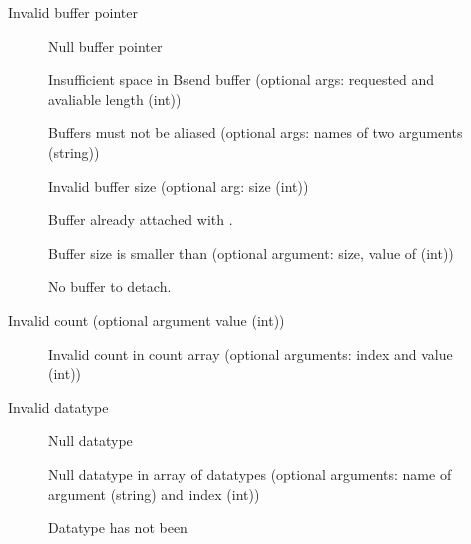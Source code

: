 \begin{description}
\item[ ]Invalid buffer pointer
    \begin{description}
    \item[ ]Null buffer pointer
    \item[
    ]Insufficient space in Bsend 
      buffer (optional args: requested and avaliable length (int))
    \item[ ]Buffers
    must not be aliased 
      (optional args: names of two arguments (string))
    \item[ ]Invalid
    buffer size (optional arg: 
      size (int))
    \item[
    ]Buffer already attached with 
      . 
    \item[
    ]Buffer size is smaller than 
       (optional argument: size, value of
       (int)) 
    \item[ ]No
    buffer to detach. 
    \end{description}
\item[ ]Invalid count (optional
    argument value (int)) 
    \begin{description}
    \item[ ]Invalid
    count in count array 
      (optional arguments: index and value (int))
    \end{description}
\item[ ]Invalid datatype
    \begin{description}
    \item[ ]Null datatype
    \item[
    ]Null datatype in array of 
      datatypes (optional arguments: name of argument (string) and index (int))
    \item[
    ]Datatype has not been 

\end{description}
\end{description}
